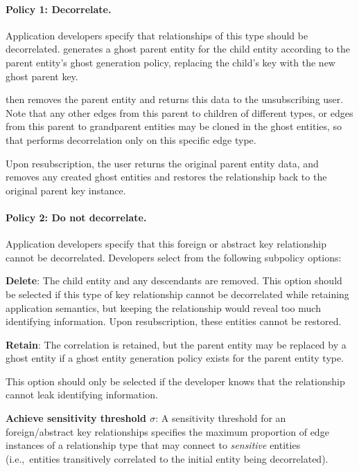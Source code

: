 \paragraph{Policy 1: Decorrelate.}
Application developers specify that relationships of this type should be decorrelated.
\sys generates a ghost parent entity for the child entity according to the parent entity's ghost
generation policy, replacing the child's key with the new ghost parent key.

\sys then removes the parent entity and returns this data to the unsubscribing user. Note that any other
edges from this parent to children of different types, or edges from this parent to grandparent
entities may be cloned in the ghost entities, so that \sys performs decorrelation only on this specific edge type.

Upon resubscription, the user returns the original parent entity data, and \sys removes any created
ghost entities and restores the relationship back to the original parent key instance.

%
\paragraph{Policy 2: Do not decorrelate.}
Application developers specify that this foreign or abstract key relationship cannot be decorrelated.
Developers select from the following subpolicy options: 
    
    \textbf{Delete}: The child entity and any descendants are removed. This option should be
        selected if this type of key relationship cannot be decorrelated while retaining application
        semantics, but keeping the relationship would reveal too much identifying information.
        Upon resubscription, these entities cannot be restored.

    \textbf{Retain}: The correlation is retained, but the parent entity may be replaced by a ghost
    entity if a ghost entity generation policy exists for the parent entity type.

        This option should only be selected if the developer knows that the
        relationship cannot leak identifying information.

    \textbf{Achieve sensitivity threshold $\sigma$}:
        A sensitivity threshold for an foreign/abstract key relationships specifies the maximum
        proportion of edge instances of a relationship type that may connect to \emph{sensitive}
        entities (i.e.,\ entities transitively correlated to the initial entity being decorrelated). 

